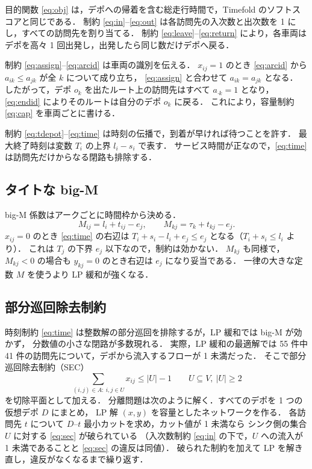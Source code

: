 \documentclass[11pt,a4paper]{ltjsarticle}
\newcommand{\Vset}{V}
\begin{document}
目的関数 \eqref{eq:obj} は，デポへの帰着を含む総走行時間で，Timefold のソフトスコアと同じである．
制約 \eqref{eq:in}--\eqref{eq:out} は各訪問先の入次数と出次数を 1 にし，すべての訪問先を割り当てる．
制約 \eqref{eq:leave}--\eqref{eq:return} により，各車両はデポを高々 1 回出発し，出発したら同じ数だけデポへ戻る．

制約 \eqref{eq:assign}--\eqref{eq:arcid} は車両の識別を伝える．
$x_{ij}=1$ のとき \eqref{eq:arcid} から $a_{ik} \le a_{jk}$ が全 $k$ について成り立ち，
\eqref{eq:assign} と合わせて $a_{ik} = a_{jk}$ となる．
したがって，デポ $o_k$ を出たルート上の訪問先はすべて $a_{\cdot k}=1$ となり，
\eqref{eq:endid} によりそのルートは自分のデポ $o_k$ に戻る．
これにより，容量制約 \eqref{eq:cap} を車両ごとに書ける．

制約 \eqref{eq:tdepot}--\eqref{eq:time} は時刻の伝播で，到着が早ければ待つことを許す．
最大終了時刻は変数 $T_i$ の上界 $l_i - s_i$ で表す．
サービス時間が正なので，\eqref{eq:time} は訪問先だけからなる閉路も排除する．

\subsection{タイトな big-M}

big-M 係数はアークごとに時間枠から決める．
\begin{equation}
  M_{ij} = l_i + t_{ij} - e_j, \qquad M_{kj} = \tau_k + t_{kj} - e_j.
\end{equation}
$x_{ij}=0$ のとき \eqref{eq:time} の右辺は
$T_i + s_i - l_i + e_j \le e_j$ となる（$T_i + s_i \le l_i$ より）．
これは $T_j$ の下界 $e_j$ 以下なので，制約は効かない．
$M_{kj}$ も同様で，$M_{kj}<0$ の場合も $y_{kj}=0$ のとき右辺は $e_j$ になり妥当である．
一律の大きな定数 $M$ を使うより LP 緩和が強くなる．

\subsection{部分巡回除去制約}

時刻制約 \eqref{eq:time} は整数解の部分巡回を排除するが，LP 緩和では big-M が効かず，
分数値の小さな閉路が多数現れる．
実際，LP 緩和の最適解では 55 件中 41 件の訪問先について，デポから流入するフローが 1 未満だった．
そこで部分巡回除去制約（SEC）
\begin{equation}
  \sum_{(i,j)\in A:\ i,j\in U} x_{ij} \le |U| - 1 \qquad U \subseteq \Vset,\ |U|\ge 2 \label{eq:sec}
\end{equation}
を切除平面として加える．
分離問題は次のように解く．すべてのデポを 1 つの仮想デポ $D$ にまとめ，
LP 解 $(x, y)$ を容量としたネットワークを作る．
各訪問先 $t$ について $D$--$t$ 最小カットを求め，カット値が 1 未満なら
シンク側の集合 $U$ に対する \eqref{eq:sec} が破られている
（入次数制約 \eqref{eq:in} の下で，$U$ への流入が 1 未満であることと \eqref{eq:sec} の違反は同値）．
破られた制約を加えて LP を解き直し，違反がなくなるまで繰り返す．
\end{document}

